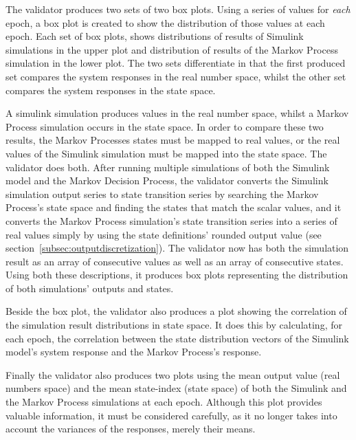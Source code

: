 The validator produces two sets of two box plots. Using a series of values for \textit{each} epoch, a box plot is created to show the distribution of those values at each epoch. Each set of box plots, shows distributions of results of Simulink simulations in the upper plot and distribution of results of the Markov Process simulation in the lower plot. The two sets differentiate in that the first produced set compares the system responses in the real number space, whilst the other set compares the system responses in the state space.

A simulink simulation produces values in the real number space, whilst a Markov Process simulation occurs in the state space. In order to compare these two results, the Markov Processes states must be mapped to real values, or the real values of the Simulink simulation must be mapped into the state space. The validator does both. After running multiple simulations of both the Simulink model and the Markov Decision Process, the validator converts the Simulink simulation output series to state transition series by searching the Markov Process's state space and finding the states that match the scalar values, and it converts the Markov Process simulation's state transition series into a series of real values simply by using the state definitions' rounded output value (see section~\ref{subsec:outputdiscretization}). The validator now has both the simulation result as an array of consecutive values as well as an array of consecutive states. Using both these descriptions, it produces box plots representing the distribution of both simulations' outputs and states.

Beside the box plot, the validator also produces a plot showing the correlation of the simulation result distributions in state space. It does this by calculating, for each epoch, the correlation between the state distribution vectors of the Simulink model's system response and the Markov Process's response.

Finally the validator also produces two plots using the mean output value (real numbers space) and the mean state-index (state space) of both the Simulink and the Markov Process simulations at each epoch. Although this plot provides valuable information, it must be considered carefully, as it no longer takes into account the variances of the responses, merely their means.

